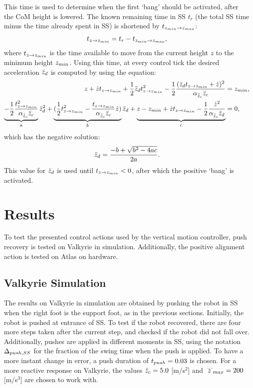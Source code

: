 This time is used to determine when the first `bang' should be activated, after the \ac{CoM} height is lowered. The known remaining time in \ac{SS} $t_{r}$ (the total \ac{SS} time minus the time already spent in \ac{SS}) is shortened by $ t_{z_{min} \rightarrow z_{max}}$:
\begin{equation}
	t_{z \rightarrow z_{min}} =t_{r} - t_{z_{min} \rightarrow z_{max}},
\end{equation}
where $t_{z \rightarrow z_{min}} $ is the time available to move from the current height $z$ to the minimum height $z_{min}$. Using this time, at every control tick the desired acceleration $\ddot{z}_d$ is computed by using the equation:
\begin{align}
	z + \dot{z}t_{z \rightarrow z_{min}} + \frac{1}{2}\ddot{z}_d t_{z \rightarrow z_{min}}^2 - \frac{1}{2}\frac{(\ddot{z}_d t_{z \rightarrow z_{min}} + \dot{z})^2}{\alpha_{\hat{\ddot{z}}_{c}} \ddot{z}_{c}} &= z_{min}, \\
	\underbrace{-\frac{1}{2}\frac{t_{z \rightarrow z_{min}}^2}{\alpha_{\hat{\ddot{z}}_{c}} \ddot{z}_{c}}}_a \ddot{z}_d^2 + \underbrace{(\frac{1}{2}t_{z \rightarrow z_{min}}^2-\frac{t_{z \rightarrow z_{min}}}{\alpha_{\hat{\ddot{z}}_{c}} \ddot{z}_{c}} \dot{z})}_b \ddot{z}_d + \underbrace{z -z_{min} +\dot{z}t_{z \rightarrow z_{min}} -\frac{1}{2}\frac{\dot{z}^2}{\alpha_{\hat{\ddot{z}}_{c}} \ddot{z}_d}}_c&=0,
\end{align}
which has the negative solution:
\begin{equation}
 	\ddot{z}_d = \frac{-b + \sqrt{b^2-4ac}}{2a}.
\end{equation}
This value for $\ddot{z}_d$ is used until $t_{z \rightarrow z_{min}}<0$, after which the positive `bang' is activated. 

\section{Results}
To test the presented control actions used by the vertical motion controller, push recovery is tested on Valkyrie in simulation. Additionally, the positive alignment action is tested on Atlas on hardware.
\subsection{Valkyrie Simulation}
The results on Valkyrie in simulation are obtained by pushing the robot in \ac{SS} when the right foot is the support foot, as in the previous sections. Initially, the robot is pushed at entrance of \ac{SS}. To test if the robot recovered, there are four more steps taken after the current step, and checked if the robot did not fall over. Additionally, pushes are applied in different moments in \ac{SS}, using the notation $\Delta_{push,SS}$ for the fraction of the swing time when the push is applied. To have a more instant change in error, a push duration of $t_{push}=0.03$ is chosen. For a more reactive response on Valkyrie, the values $\ddot{z}_{c}=5.0$ [m/s$^2$] and $\dddot{z}_{max}=200$ [m/s$^3$] are chosen to work with.


